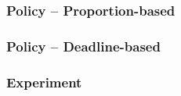 \documentclass{beamer}
\begin{document}
\begin{frame}
  \frametitle{Policy -- Proportion-based}
\end{frame}
\begin{frame}
  \frametitle{Policy -- Deadline-based}
\end{frame}
\begin{frame}
  \frametitle{Experiment}
\end{frame}
\end{document}

